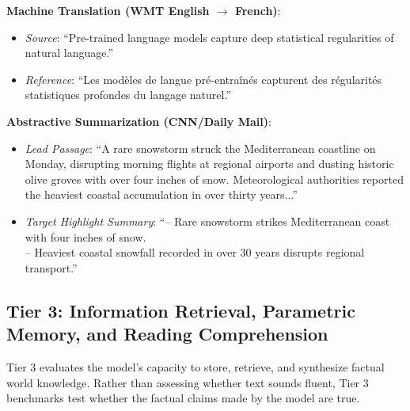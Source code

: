 \documentclass[../../main.tex]{subfiles}
\begin{document}
\begin{center}
\begin{minipage}{0.95\textwidth}
\begin{tcolorbox}[colback=cardBg,colframe=cardLine,arc=2pt,boxrule=0.5pt,title=\textbf{Task Example: Conditional Sequence Generation (Translation \& Summarization)}]
\small\sffamily
\textbf{Machine Translation (WMT English $\to$ French)}:
\begin{itemize}[leftmargin=1.5em,itemsep=1pt]
    \item \textit{Source}: ``Pre-trained language models capture deep statistical regularities of natural language.''
    \item \textit{Reference}: ``Les modèles de langue pré-entraînés capturent des régularités statistiques profondes du langage naturel.''
\end{itemize}
\textbf{Abstractive Summarization (CNN/Daily Mail)}:
\begin{itemize}[leftmargin=1.5em,itemsep=1pt]
    \item \textit{Lead Passage}: ``A rare snowstorm struck the Mediterranean coastline on Monday, disrupting morning flights at regional airports and dusting historic olive groves with over four inches of snow. Meteorological authorities reported the heaviest coastal accumulation in over thirty years...''
    \item \textit{Target Highlight Summary}: ``-- Rare snowstorm strikes Mediterranean coast with four inches of snow. \\ -- Heaviest coastal snowfall recorded in over 30 years disrupts regional transport.''
\end{itemize}
\end{tcolorbox}
\end{minipage}
\end{center}

\subsection{Tier 3: Information Retrieval, Parametric Memory, and Reading Comprehension}
\label{subsec:tier3_qa_memory}

Tier 3 evaluates the model's capacity to store, retrieve, and synthesize factual world knowledge. Rather than assessing whether text sounds fluent, Tier 3 benchmarks test whether the factual claims made by the model are true.
\end{document}
